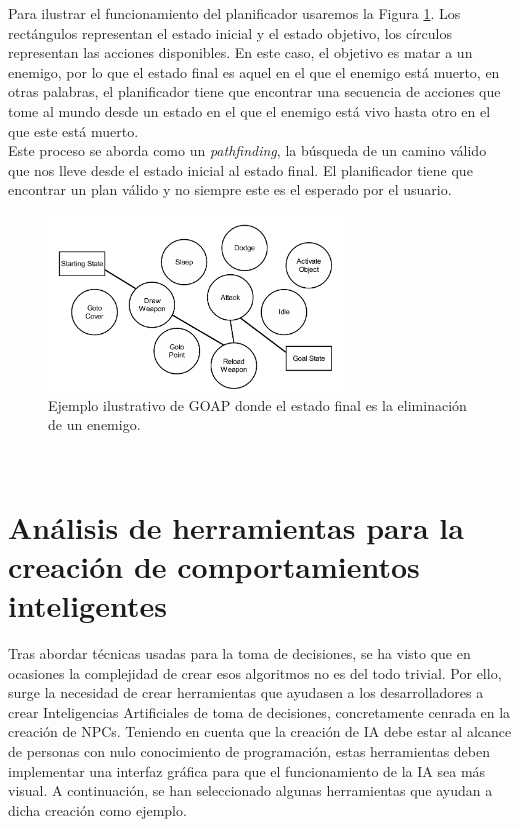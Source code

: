 \begin{itemize}
Para ilustrar el funcionamiento del planificador usaremos la Figura \ref{fig:GOAP_Planificador}.
Los rectángulos representan el estado inicial y el estado objetivo, los círculos representan las acciones disponibles.
En este caso, el objetivo es matar a un enemigo, por lo que el estado final es aquel en el que el enemigo está muerto, en otras palabras, el planificador tiene que encontrar una secuencia de acciones que tome al mundo desde un estado en el que el enemigo está vivo hasta otro en el que este está muerto.\\
Este proceso se aborda como un \textit{pathfinding}, la búsqueda de un camino válido que nos lleve desde el estado inicial al estado final. El planificador tiene que encontrar un plan válido y no siempre este es el esperado por el usuario. 


\begin{figure}[t]
	\centering
	\includegraphics[width = 0.7\textwidth]{Imagenes/GOAP_Planificador.png}
	\caption{Ejemplo ilustrativo de GOAP donde el estado final es la eliminación de un enemigo.}
	\label{fig:GOAP_Planificador}
\end{figure}
	
	
\end{itemize}
\\ 
\section{Análisis de herramientas para la creación de comportamientos inteligentes}

Tras abordar técnicas usadas para la toma de decisiones, se ha visto que en ocasiones la complejidad de crear esos algoritmos no es del todo trivial. Por ello, surge la necesidad de crear herramientas que ayudasen a los desarrolladores a crear Inteligencias Artificiales de toma de decisiones, concretamente cenrada en la creación de NPCs. Teniendo en cuenta que la creación de IA debe estar al alcance de personas con nulo conocimiento de programación, estas herramientas deben implementar una interfaz gráfica para que el funcionamiento de la IA sea más visual.
A continuación, se han seleccionado algunas herramientas que ayudan a dicha creación como ejemplo.\\

